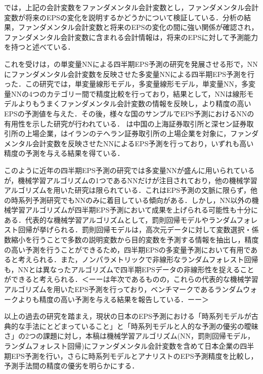 \documentclass[a4paper，12pt]{jsarticle}
\begin{document}
\cite*{abarbanell1997fundamental}では，上記の会計変数をファンダメンタル会計変数とし，ファンダメンタル会計変数が将来のEPSの変化を説明するかどうかについて検証している．分析の結果，ファンダメンタル会計変数と将来のEPSの変化の間に強い関係が確認され，ファンダメンタル会計変数に含まれる会計情報は，将来のEPSに対して予測能力を持つと述べている．

これを受け\cite{zhang2004neural}は，\cite{callen1996neural}の単変量NNによる四半期EPS予測の研究を発展させる形で，NNにファンダメンタル会計変数を反映させた多変量NNによる四半期EPS予測を行った．この研究では，単変量線形モデル，多変量線形モデル，単変量NN，多変量NNの4つのカテゴリー間で精度比較を行っており，結果として，NNは線形モデルよりもうまくファンダメンタル会計変数の情報を反映し，より精度の高いEPSの予測値を与えた．その後，様々な国のサンプルでEPS予測におけるNNの有用性を示した研究が行われている．\cite*{cao2009forecasting} は中国の上海証券取引所と深セン証券取引所の上場企業，\cite{etemadi2015earnings}はイランのテヘラン証券取引所の上場企業を対象に，ファンダメンタル会計変数を反映させたNNによるEPS予測を行っており，いずれも高い精度の予測を与える結果を得ている．

このように近年の四半期EPS予測の研究では多変量NNが盛んに用いられているが，機械学習アルゴリズムの1つであるNNだけが注目されており，他の機械学習アルゴリズムを用いた研究は限られている．これはEPS予測の文脈に限らず，他の時系列予測研究でもNNのみに着目している傾向がある\citep{ahmed2010empirical}．しかし，NN以外の機械学習アルゴリズムが四半期EPS予測において成果を上げられる可能性も十分にある．代表的な機械学習アルゴリズムとして，罰則回帰モデルやランダムフォレスト回帰が挙げられる\citep{hastie2009esl}．罰則回帰モデルは，高次元データに対して変数選択・係数縮小を行うことで多数の説明変数から目的変数を予測する情報を抽出し，精度の高い予測を行うことができるため，四半期EPSの多変量予測において有用であると考えられる．また，ノンパラメトリックで非線形なランダムフォレスト回帰\citep{breiman2001random}も，NNとは異なったアルゴリズムで四半期EPSデータの非線形性を捉えることができると考えられる．＜ーー\cite*{cao2020fundamental}は年次であるものの，これらの代表的な機械学習アルゴリズムを用いたEPS予測を行っており，ベンチマークであるランダムウォークよりも精度の高い予測を与える結果を報告している．ーー＞


以上の過去の研究を踏まえ，現状の日本のEPS予測における「時系列モデルが古典的な手法にとどまっていること」と「時系列モデルと人的な予測の優劣の曖昧さ」の2つの課題に対し，本稿は機械学習アルゴリズム(NN，罰則回帰モデル，ランダムフォレスト回帰)にファンダメンタル会計変数を含めて日本企業の四半期EPS予測を行い，さらに時系列モデルとアナリストのEPS予測精度を比較し，予測手法間の精度の優劣を明らかにする．
\end{document}
